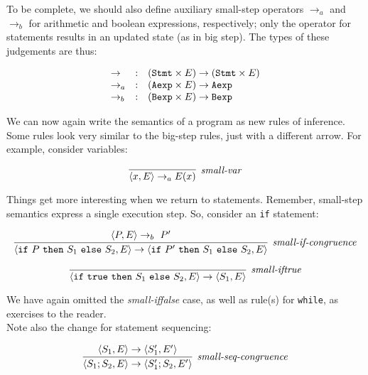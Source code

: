 \documentclass[11pt]{article}
\begin{document}
To be complete, we should also define auxiliary small-step operators
$\rightarrow_a$ and $\rightarrow_b$ for arithmetic and boolean expressions,
respectively; only the operator for statements results in an updated state (as
in big step).  The types of these judgements are thus:

\[
\begin{array}{lll}
\rightarrow & : & (\mathtt{Stmt} \times E) \rightarrow (\mathtt{Stmt} \times E) \\
\rightarrow_a & : & (\mathtt{Aexp} \times E) \rightarrow \mathtt{Aexp} \\
\rightarrow_b & : & (\mathtt{Bexp} \times E) \rightarrow \mathtt{Bexp} \\
\end{array}
\]

\noindent We can now again write the semantics of a \WhileLang  program as new rules
of inference.  Some rules look very similar to the big-step rules, just with a
different arrow.  For example, consider variables:

\begin{equation*}
\infer[\textit{small-var}]{\langle x, E \rangle \rightarrow_a E(x)}{}
\end{equation*}

\noindent Things get more interesting when we return to statements.  Remember,
small-step semantics express a single execution step.  So, consider an
\texttt{if} statement:

\begin{equation*}
\infer[\textit{small-if-congruence}]{\langle \mathtt{if}~P~\mathtt{then}~S_1~\mathtt{else}~S_2, E \rangle \rightarrow \langle \mathtt{if}~P'~\mathtt{then}~S_1~\mathtt{else}~S_2, E \rangle}
{ \langle P, E \rangle \rightarrow_b~P'}
\end{equation*}


\begin{equation*}
\infer[\textit{small-iftrue}]{\langle \mathtt{if}~\mathtt{true}~\mathtt{then}~S_1~\mathtt{else}~S_2, E \rangle \rightarrow
  \langle S_1,E \rangle}{}
\end{equation*}

 We have again omitted the \textit{small-iffalse} case, as well as rule(s) for
\texttt{while}, as exercises to the reader.\\

\noindent Note also the change for statement sequencing:

\begin{equation*}
\infer[\textit{small-seq-congruence}]{\langle S_1;S_2, E \rangle \rightarrow \langle S_1';S_2, E' \rangle}{
\langle S_1, E \rangle \rightarrow \langle S_1',E' \rangle
}{}
\end{equation*}
\end{document}
